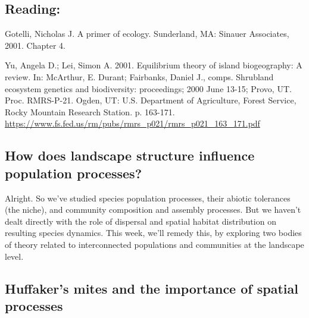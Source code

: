 \documentclass[12pt]{article}
\begin{document}
\subsection*{Reading:}


Gotelli, Nicholas J. A primer of ecology. Sunderland, MA: Sinauer Associates, 2001. Chapter 4. \\

\bigskip

Yu, Angela D.; Lei, Simon A. 2001. Equilibrium theory of island biogeography: A review. In: McArthur, E. Durant; Fairbanks, Daniel J., comps. Shrubland ecosystem genetics and biodiversity: proceedings; 2000 June 13-15; Provo, UT. Proc. RMRS-P-21. Ogden, UT: U.S. Department of Agriculture, Forest Service, Rocky Mountain Research Station. p. 163-171. \url{https://www.fs.fed.us/rm/pubs/rmrs_p021/rmrs_p021_163_171.pdf}















\begin{center}
\noindent\hrulefill 
\end{center}





\clearpage

\subsection*{How does landscape structure influence population processes?}

Alright. So we've studied species population processes, their abiotic tolerances (the niche), and community composition and assembly processes. But we haven't dealt directly with the role of dispersal and spatial habitat distribution on resulting species dynamics. This week, we'll remedy this, by exploring two bodies of theory related to interconnected populations and communities at the landscape level. 





\bigskip


\subsection*{Huffaker's mites and the importance of spatial processes}
\end{document}
